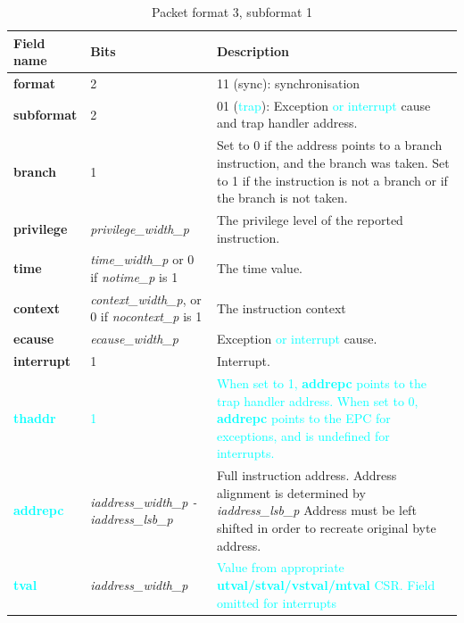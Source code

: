 \begin{table}[htp]
  \centering
  \caption{Packet format 3, subformat 1}
  \label{tab:te_inst3-1}
  \begin{tabulary}{\textwidth}{|l|p{35mm}|p{90mm}|}
    \hline
    {\bf Field name} & {\bf Bits} & {\bf Description} \\
    \hline
    \textbf{format} & 2 & 11 (sync): synchronisation\\
    \hline
    \textbf{subformat} & 2 & 01 (\textcolor{cyan}{trap}): Exception \textcolor{cyan}{or interrupt} cause and trap handler address.\\
    \hline
    \textbf{branch} & 1 & Set to 0 if the address points to a branch instruction, and the branch was taken.  
              Set to 1 if the instruction is not a branch or if the branch is not taken. \\
    \hline
    \textbf{privilege} & \textit {privilege\_width\_p} & 
                The privilege level of the reported instruction.\\
    \hline
    \textbf{time} &  \textit {time\_width\_p} or 0 if \textit {notime\_p} is 1 & 
               The time value. \\
    \hline
    \textbf{context} &  \textit {context\_width\_p}, or 0 if \textit {nocontext\_p} is 1 & The instruction context  \\
    \hline
    \textbf{ecause} & \textit {ecause\_width\_p} & Exception \textcolor{cyan}{or interrupt} cause. \\
    \hline
    \textbf{interrupt} & 1 & Interrupt. \\
    \hline
    \textbf{\textcolor{cyan}{thaddr}} & \textcolor{cyan}{1} &
               \textcolor{cyan}{When set to 1, \textbf{addrepc} points to the trap handler address.  
                When set to 0,  \textbf{addrepc} points to the EPC for exceptions, and is undefined for interrupts.}\\
    \hline
    \textbf{\textcolor{cyan}{addrepc}} & \textit {iaddress\_width\_p - iaddress\_lsb\_p} & 
              Full instruction address.  Address alignment is determined by \textit {iaddress\_lsb\_p} 
              Address must be left shifted in order to recreate original byte address. \\
    \hline
    \textbf{\textcolor{cyan}{tval}} & \textit {iaddress\_width\_p} & 
           \textcolor{cyan}{Value from appropriate \textbf{utval/stval/vstval/mtval} CSR.  
           Field omitted for interrupts}\\
    \hline
  \end{tabulary}
\end{table}

